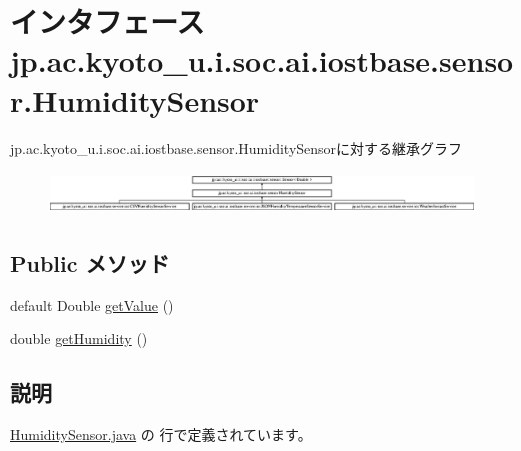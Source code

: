 \hypertarget{interfacejp_1_1ac_1_1kyoto__u_1_1i_1_1soc_1_1ai_1_1iostbase_1_1sensor_1_1_humidity_sensor}{\section{インタフェース jp.\-ac.\-kyoto\-\_\-u.\-i.\-soc.\-ai.\-iostbase.\-sensor.\-Humidity\-Sensor}
\label{interfacejp_1_1ac_1_1kyoto__u_1_1i_1_1soc_1_1ai_1_1iostbase_1_1sensor_1_1_humidity_sensor}
}
jp.\-ac.\-kyoto\-\_\-u.\-i.\-soc.\-ai.\-iostbase.\-sensor.\-Humidity\-Sensorに対する継承グラフ\begin{figure}[H]
\begin{center}
\leavevmode
\includegraphics[height=1.131313cm]{interfacejp_1_1ac_1_1kyoto__u_1_1i_1_1soc_1_1ai_1_1iostbase_1_1sensor_1_1_humidity_sensor}
\end{center}
\end{figure}
\subsection*{Public メソッド}
\begin{DoxyCompactItemize}
\item 
default Double \hyperlink{interfacejp_1_1ac_1_1kyoto__u_1_1i_1_1soc_1_1ai_1_1iostbase_1_1sensor_1_1_humidity_sensor_a4ab9e9cdeea6641a4b077b66f0e24aaa}{get\-Value} ()
\item 
double \hyperlink{interfacejp_1_1ac_1_1kyoto__u_1_1i_1_1soc_1_1ai_1_1iostbase_1_1sensor_1_1_humidity_sensor_aeed5c27db32a6ad136adbbbc079a7ec2}{get\-Humidity} ()
\end{DoxyCompactItemize}


\subsection{説明}


 \hyperlink{_humidity_sensor_8java_source}{Humidity\-Sensor.\-java} の  行で定義されています。



